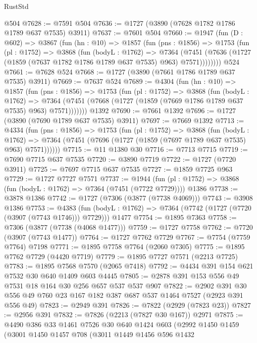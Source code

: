 \begin{lexlean}{RustStd}
\begin{coremodule}
    @504
@7628 := @7591 @504
@7636 := @1727 (@3890 (@7628 @1782 @1786 @1789 @637 @7535) @3911)
@7637 := @7601 @504
@7660 := @1947
    (fun (D : @602) =>
    @3867
      (fun (hn : @10) =>
      @1857
        (fun (pns : @1856) =>
        @1753
          (fun (pl : @1752) =>
          @3868
            (fun (bodyL : @1762) =>
            @7364
              (@7451 (@7636 (@1727 (@1859 (@7637 @1782 @1786 @1789 @637 @7535) @963) @7571))))))))
    @524
@7661 := @7628 @524
@7668 := @1727 (@3890 (@7661 @1786 @1789 @637 @7535) @3911)
@7669 := @7637 @524
@7689 := @4304
    (fun (hn : @10) =>
    @1857
      (fun (pns : @1856) =>
      @1753
        (fun (pl : @1752) =>
        @3868
          (fun (bodyL : @1762) =>
          @7364 (@7451 (@7668 (@1727 (@1859 (@7669 @1786 @1789 @637 @7535) @963) @7571)))))))
    @1392
@7690 := @7661 @1392
@7696 := @1727 (@3890 (@7690 @1789 @637 @7535) @3911)
@7697 := @7669 @1392
@7713 := @4334
    (fun (pns : @1856) =>
    @1753
      (fun (pl : @1752) =>
      @3868
        (fun (bodyL : @1762) =>
        @7364 (@7451 (@7696 (@1727 (@1859 (@7697 @1789 @637 @7535) @963) @7571))))))
@7715 := @11 @1380 @30
@7716 := @7713 @7715
@7719 := @7690 @7715 @637 @7535
@7720 := @3890 @7719
@7722 := @1727 (@7720 @3911)
@7725 := @7697 @7715 @637 @7535
@7727 := @1859 @7725 @963
@7729 := @1727 @7727 @7571
@7737 := @1944
    (fun (pl : @1752) => @3868 (fun (bodyL : @1762) => @7364 (@7451 (@7722 @7729))))
    @1386
@7738 := @3878 @1386
@7742 := @1727 (@7306 (@3877 (@7738 @4069)))
@7743 := @3908 @1386
@7753 := @4383
    (fun (bodyL : @1762) => @7364 (@7742 (@1727 (@7720 (@3907 (@7743 @1746))) @7729)))
    @1477
@7754 := @1895 @7363
@7758 := @7306 (@3877 (@7738 (@4068 @1477)))
@7759 := @1727 @7758
@7762 := @7720 (@3907 (@7743 @1477))
@7764 := @1727 @7762 @7729
@7767 := @7754 (@7759 @7764) @7198
@7771 := @1895 @7758 @7764 (@2060 @7305)
@7775 := @1895 @7762 @7729 (@4420 @7719)
@7779 := @1895 @7727 @7571 (@2213 @7725)
@7783 := @1895 @7568 @7570 (@2065 @7418)
@7792 := @4434 @391 @154 @621 @7532 @30 @640 @1409 @603 @4445
@7805 := @2878 @391 @153 @556 @49 @7531 @18 @164 @30 @256 @657 @537 @537 @907
@7822 := @2902 @391 @30 @556 @49 @760 @23 @167 @182 @387 @687 @537 @1464 @7527 (@2923 @391 @556 @49)
@7823 := @2949 @391
@7826 := @7822 (@2929 (@7823 @23))
@7827 := @2956 @391
@7832 := @7826 (@2213 (@7827 @30 @167)) @2971
@7875 := @4490
    @386
    @33
    @1461
    @7526
    @30
    @640
    @1424
    @603
    (@2992
      @1450
      @1459
      (@3001
        @1450
        @1457
        @708
        (@3011
          @1449
          @1456
          @596
          @1432

\end{coremodule}
\end{lexlean}
